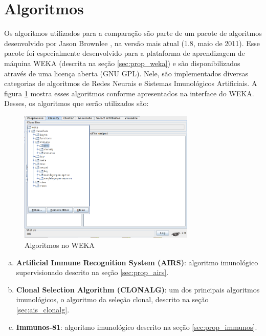 \section{Algoritmos}

Os algoritmos utilizados para a comparação são parte de um pacote de algoritmos desenvolvido por Jason Brownlee \cite{Brownlee2011}, na versão mais atual (1.8, maio de 2011). Esse pacote foi especialmente desenvolvido para a plataforma de aprendizagem de máquina WEKA (descrita na seção \ref{sec:prop_weka}) e são disponibilizados através de uma licença aberta (GNU GPL). Nele, são implementados diversas categorias de algoritmos de Redes Neurais e Sistemas Imunológicos Artificiais. A figura \ref{fig:prop_wekaais} mostra esses algoritmos conforme apresentados na interface do WEKA. Desses, os algoritmos que serão utilizados são:

\vspace{0.5cm}
\begin{figure}[h]
    \centering
    \caption{Algoritmos no WEKA}
    \label{fig:prop_wekaais}
    \vspace{0.5cm}
    \includegraphics[width=0.75\textwidth]{img/weka_ais.png}
\end{figure}
\vspace{0.5cm}

\begin{enumerate}[a)]
    \item \textbf{Artificial Immune Recognition System (AIRS)}: algoritmo imunológico supervisionado descrito na seção \ref{sec:prop_airs}.
    \item \textbf{Clonal Selection Algorithm (CLONALG)}: um dos principais algoritmos imunológicos, o algoritmo da seleção clonal, descrito na seção \ref{sec:ais_clonalg}.
    \item \textbf{Immunos-81}: algoritmo imunológico descrito na seção \ref{sec:prop_immunos}.
\end{enumerate}

